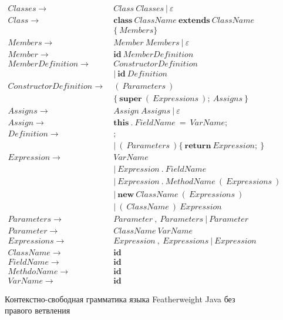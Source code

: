 \begin{figure}
    \begin{align*}
        Classes \rightarrow&\ Class\ Classes\ |\ \varepsilon\\
        Class \rightarrow&\ \pmb{class}\ ClassName\ \pmb{extends}\ ClassName\\
        &\ \{\ Members \}\\
        Members \rightarrow&\ Member\ Members\ |\ \varepsilon\\
        Member \rightarrow&\ \pmb{id}\ MemberDefinition\\
        MemberDefinition \rightarrow&\ ConstructorDefinition\\
        &\ |\ \pmb{id}\ Definition\\
        ConstructorDefinition \rightarrow&\ (\ Parameters\ )\\
        &\ \{\ \pmb{super}\ (\ Expressions\ );\ Assigns\ \}\\
        Assigns \rightarrow&\ Assign\ Assigns\ |\ \varepsilon\\
        Assign \rightarrow&\ \pmb{this}\ .\ FieldName\ =\ VarName;\\
        Definition \rightarrow&\ ;\\
        &\ |\ (\ Parameters\ ) \{\ \pmb{return}\ Expression;\ \}\\
        Expression \rightarrow&\ VarName\\
        &\ |\ Expression\ .\ FieldName\\
        &\ |\ Expression\ .\ MethodName\ (\ Expressions\ )\\
        &\ |\ \pmb{new}\ ClassName\ (\ Expressions\ )\\
        &\ |\ (\ ClassName\ )\ Expression\\
        Parameters \rightarrow&\ Parameter\ ,\ Parameters\ |\ Parameter\\
        Parameter \rightarrow&\ ClassName\ VarName\\
        Expressions \rightarrow&\ Expression\ ,\ Expressions\ |\ Expression\\
        ClassName \rightarrow&\ \pmb{id}\\
        FieldName \rightarrow&\ \pmb{id}\\
        MethdoName \rightarrow&\ \pmb{id}\\
        VarName \rightarrow&\ \pmb{id}
    \end{align*}
    \caption{Контекстно-свободная грамматика языка Featherweight Java без правого ветвления}
    \label{cf-fj-happy}
\end{figure}
